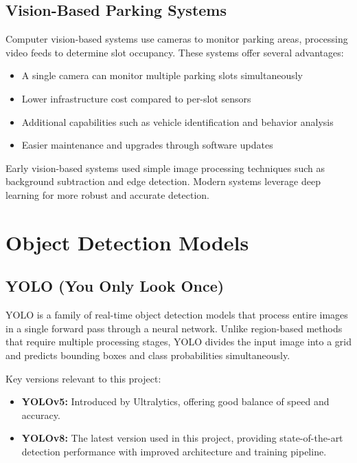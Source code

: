 \documentclass[12pt,a4paper]{report}
\begin{document}
\subsection{Vision-Based Parking Systems}

Computer vision-based systems use cameras to monitor parking areas, processing video feeds to determine slot occupancy. These systems offer several advantages:

\begin{itemize}
    \item A single camera can monitor multiple parking slots simultaneously
    \item Lower infrastructure cost compared to per-slot sensors
    \item Additional capabilities such as vehicle identification and behavior analysis
    \item Easier maintenance and upgrades through software updates
\end{itemize}

Early vision-based systems used simple image processing techniques such as background subtraction and edge detection. Modern systems leverage deep learning for more robust and accurate detection.

\section{Object Detection Models}

\subsection{YOLO (You Only Look Once)}

YOLO \cite{b1} is a family of real-time object detection models that process entire images in a single forward pass through a neural network. Unlike region-based methods that require multiple processing stages, YOLO divides the input image into a grid and predicts bounding boxes and class probabilities simultaneously.

Key versions relevant to this project:

\begin{itemize}
    \item \textbf{YOLOv5:} Introduced by Ultralytics, offering good balance of speed and accuracy.
    \item \textbf{YOLOv8:} The latest version used in this project, providing state-of-the-art detection performance with improved architecture and training pipeline.
\end{itemize}
\end{document}
